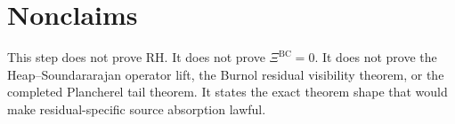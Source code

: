 \documentclass[11pt]{article}
\newcommand{\XiBC}{\Xi^{\mathrm{BC}}}
\begin{document}
\section{Nonclaims}
This step does not prove RH. It does not prove $\XiBC=0$. It does not prove the Heap--Soundararajan operator lift, the Burnol residual visibility theorem, or the completed Plancherel tail theorem. It states the exact theorem shape that would make residual-specific source absorption lawful.
\end{document}
